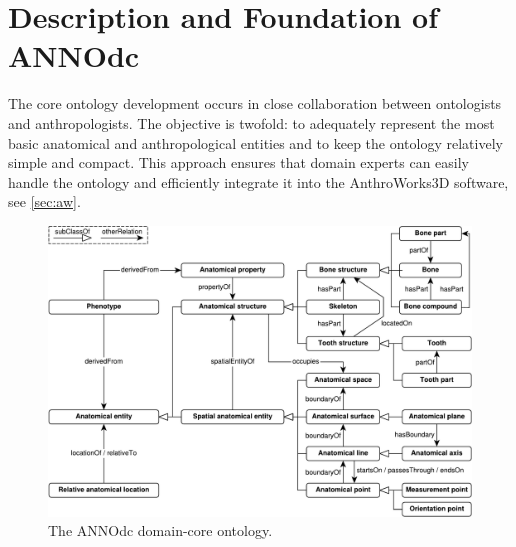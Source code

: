 \documentclass[sw]{iosart2x}
\newcommand{\aw}{AnthroWorks3D}
\begin{document}

\section{Description and Foundation of ANNOdc}\label{sec:core}
The core ontology development occurs in close collaboration between ontologists and anthropologists.
The objective is twofold: to adequately represent the most basic anatomical and anthropological entities and to keep the ontology relatively simple and compact.
This approach ensures that domain experts can easily handle the ontology and efficiently integrate it into the \aw{} software, see \cref{sec:aw}.

\begin{figure}[h]
\includegraphics[width=\textwidth]{img/core.pdf}
\caption{The ANNOdc domain-core ontology.}\label{fig:core}
\end{figure}
\end{document}
